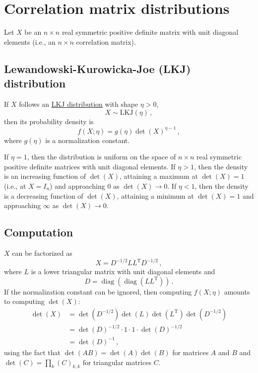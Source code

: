 \documentclass[12pt]{article}
\DeclareMathOperator{\diag}{diag}
\newcommand{\transpose}[1]{#1^{\mathrm{T}}}
\begin{document}
\setlength{\parskip}{5mm}
\setlength{\parindent}{0mm}

\section{Correlation matrix distributions}

Let $X$ be an $n \times n$ real symmetric positive definite matrix
with unit diagonal elements (i.e., an $n \times n$ correlation matrix).

\subsection{Lewandowski-Kurowicka-Joe (LKJ) distribution}

If $X$ follows an
\href{https://mc-stan.org/docs/functions-reference/lkj-correlation.html}{LKJ distribution}
with shape $\eta > 0$,
\begin{equation}
X \sim \mathrm{LKJ}(\eta)\,,
\end{equation}
then its probability density is
\begin{equation}
f(X;\eta) = g(\eta) \det(X)^{\eta - 1}\,,
\end{equation}
where $g(\eta)$ is a normalization constant.

If $\eta = 1$, then the distribution is uniform on the space of
$n \times n$ real symmetric positive definite matrices with unit
diagonal elements.
%
If $\eta > 1$, then the density is an increasing function of $\det(X)$,
attaining a maximum at $\det(X) = 1$ (i.e., at $X = I_n$)
and approaching $0$ as $\det(X) \to 0$.
%
If $\eta < 1$, then the density is a decreasing function of $\det(X)$,
attaining a minimum at $\det(X) = 1$
and approaching $\infty$ as $\det(X) \to 0$.

\subsection{Computation}

$X$ can be factorized as
\begin{equation}
X = D^{-1/2} L \transpose{L} D^{-1/2}\,,
\end{equation}
where $L$ is a lower triangular matrix with unit diagonal elements
and
\begin{equation}
D = \diag(\diag(L \transpose{L}))\,.
\end{equation}
If the normalization constant can be ignored,
then computing $f(X;\eta)$ amounts to computing $\det(X)$:
\begin{equation}
\begin{aligned}
\det(X)
  &= \det(D^{-1/2}) \det(L) \det(\transpose{L}) \det(D^{-1/2}) \\
  &= \det(D)^{-1/2} \cdot 1 \cdot 1 \cdot \det(D)^{-1/2} \\
  &= \det(D)^{-1}\,,
\end{aligned}
\end{equation}
using the fact that
$\det(A B) = \det(A) \det(B)$ for matrices $A$ and $B$
and
$\det(C) = \prod_{k} (C)_{k,k}$ for triangular matrices $C$.
\end{document}
